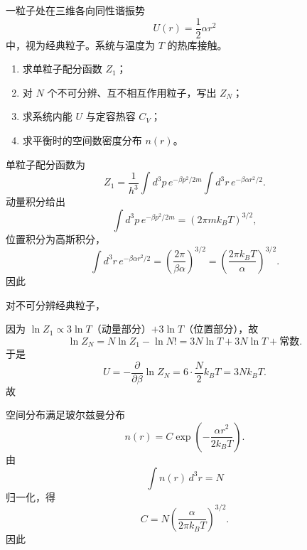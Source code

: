 \begin{question}
一粒子处在三维各向同性谐振势
\[
U(r)=\frac12 \alpha r^2
\]
中，视为经典粒子。系统与温度为 $T$ 的热库接触。

\begin{enumerate}[label=(\arabic*),leftmargin=2.5em]
  \item 求单粒子配分函数 $Z_1$；
  \item 对 $N$ 个不可分辨、互不相互作用粒子，写出 $Z_N$；
  \item 求系统内能 $U$ 与定容热容 $C_V$；
  \item 求平衡时的空间数密度分布 $n(r)$。
\end{enumerate}

\begin{solution}
单粒子配分函数为
\[
Z_1=\frac{1}{h^3}\int d^3p\,e^{-\beta p^2/2m}\int d^3r\,e^{-\beta \alpha r^2/2}.
\]
动量积分给出
\[
\int d^3p\,e^{-\beta p^2/2m}=(2\pi m k_B T)^{3/2},
\]
位置积分为高斯积分，
\[
\int d^3r\,e^{-\beta \alpha r^2/2}
=\left(\frac{2\pi}{\beta\alpha}\right)^{3/2}
=\left(\frac{2\pi k_B T}{\alpha}\right)^{3/2}.
\]
因此

对不可分辨经典粒子，

因为 $\ln Z_1 \propto 3\ln T$（动量部分）$+3\ln T$（位置部分），故
\[
\ln Z_N = N\ln Z_1-\ln N! = 3N\ln T + 3N\ln T + \text{常数}.
\]
于是
\[
U=-\frac{\partial}{\partial\beta}\ln Z_N = 6\cdot \frac{N}{2}k_B T = 3Nk_B T.
\]
故

空间分布满足玻尔兹曼分布
\[
n(r)=C\exp\!\left(-\frac{\alpha r^2}{2k_B T}\right).
\]
由
\[
\int n(r)\,d^3r=N
\]
归一化，得
\[
C=N\left(\frac{\alpha}{2\pi k_B T}\right)^{3/2}.
\]
因此
\end{solution}
\end{question}

